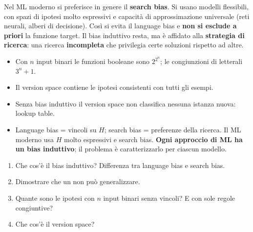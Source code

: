 Nel ML moderno si preferisce in genere il \textbf{search bias}. Si usano modelli flessibili, con spazi di
ipotesi molto espressivi e capacità di approssimazione universale (reti neurali, alberi di decisione). Così si
evita il language bias e \textbf{non si esclude a priori} la funzione target. Il bias induttivo resta, ma è
affidato alla \textbf{strategia di ricerca}: una ricerca \textbf{incompleta} che privilegia certe soluzioni
rispetto ad altre.

\begin{puntichiave}
\begin{itemize}
  \item Con $n$ input binari le funzioni booleane sono $2^{2^n}$; le congiunzioni di letterali $3^n+1$.
  \item Il version space contiene le ipotesi consistenti con tutti gli esempi.
  \item Senza bias induttivo il version space non classifica nessuna istanza nuova: lookup table.
  \item Language bias = vincoli su $H$; search bias = preferenze della ricerca. Il ML moderno usa $H$ molto
        espressivi e search bias. \textbf{Ogni approccio di ML ha un bias induttivo}; il problema è
        caratterizzarlo per ciascun modello.
\end{itemize}
\end{puntichiave}

\begin{domande}
\begin{enumerate}
  \item Che cos'è il bias induttivo? Differenza tra language bias e search bias.
  \item Dimostrare che un  non può generalizzare.
  \item Quante sono le ipotesi con $n$ input binari senza vincoli? E con sole regole congiuntive?
  \item Che cos'è il version space?
\end{enumerate}
\end{domande}
